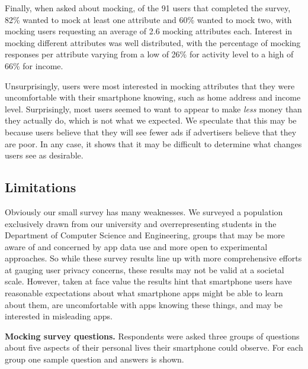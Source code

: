Finally, when asked about mocking, of the 91 users that completed the survey,
82\% wanted to mock at least one attribute and 60\% wanted to mock two, with
mocking users requesting an average of 2.6 mocking attributes each. Interest
in mocking different attributes was well distributed, with the percentage of
mocking responses per attribute varying from a low of 26\% for activity level
to a high of 66\% for income.

Unsurprisingly, users were most interested in mocking attributes that they
were uncomfortable with their smartphone knowing, such as home address and
income level. Surprisingly, most users seemed to want to appear to make
\textit{less} money than they actually do, which is not what we expected. We
speculate that this may be because users believe that they will see fewer ads
if advertisers believe that they are poor. In any case, it shows that it may
be difficult to determine what changes users see as desirable.

\subsection{Limitations}

Obviously our small survey has many weaknesses. We surveyed a population
exclusively drawn from our university and overrepresenting students in the
Department of Computer Science and Engineering, groups that may be more aware
of and concerned by app data use and more open to experimental approaches. So
while these survey results line up with more comprehensive efforts at gauging
user privacy concerns, these results may not be valid at a societal scale.
However, taken at face value the results hint that smartphone users have
reasonable expectations about what smartphone apps might be able to learn
about them, are uncomfortable with apps knowing these things, and may be
interested in misleading apps.

\begin{table}[t]



\caption{\textbf{Mocking survey questions.} Respondents were asked three
groups of questions about five aspects of their personal lives their
smartphone could observe. For each group one sample question and answers is
shown.}

  \label{table-surveyquestions}
\end{table}
